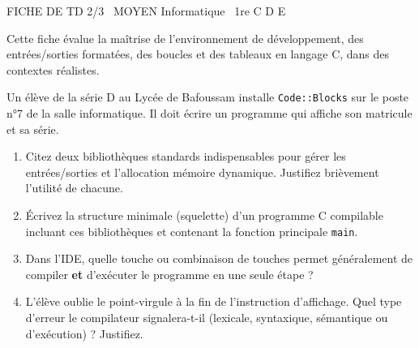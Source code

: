 \documentclass[11pt]{article}
\begin{document}
\begin{tcolorbox}[enhanced,colback=popink,colframe=popink,arc=10pt,boxrule=0pt,left=12pt,right=12pt,top=9pt,bottom=9pt]
{\color{white}\popxbold\small FICHE DE TD 2/3 \textbullet\ MOYEN \hfill Informatique \textbullet\ 1re C D E\par}
\end{tcolorbox}
\vspace{4pt}
\noindent Cette fiche évalue la maîtrise de l'environnement de développement, des entrées/sorties formatées, des boucles et des tableaux en langage C, dans des contextes réalistes.

\begin{exercice}
Un élève de la série D au Lycée de Bafoussam installe \texttt{Code::Blocks} sur le poste n°7 de la salle informatique. Il doit écrire un programme qui affiche son matricule et sa série.
\begin{enumerate}
    \item Citez deux bibliothèques standards indispensables pour gérer les entrées/sorties et l'allocation mémoire dynamique. Justifiez brièvement l'utilité de chacune.
    \item Écrivez la structure minimale (squelette) d'un programme C compilable incluant ces bibliothèques et contenant la fonction principale \texttt{main}.
    \item Dans l'IDE, quelle touche ou combinaison de touches permet généralement de compiler \textbf{et} d'exécuter le programme en une seule étape ?
    \item L'élève oublie le point-virgule à la fin de l'instruction d'affichage. Quel type d'erreur le compilateur signalera-t-il (lexicale, syntaxique, sémantique ou d'exécution) ? Justifiez.
\end{enumerate}
\end{exercice}
\end{document}
